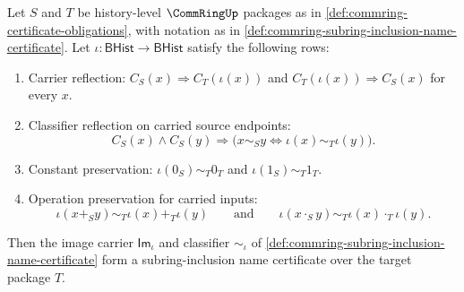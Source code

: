 \begin{theorem}
\label{thm:commring-carrier-reflection-subring-inclusion-certificate}
Let $S$ and $T$ be history-level $\CommRingUp$ packages as in \autoref{def:commring-certificate-obligations}, with notation as in \autoref{def:commring-subring-inclusion-name-certificate}. Let $\iota:\mathsf{BHist}\to\mathsf{BHist}$ satisfy the following rows:
\begin{enumerate}
  \item Carrier reflection: $C_S(x)\Longrightarrow C_T(\iota(x))$ and $C_T(\iota(x))\Longrightarrow C_S(x)$ for every $x$.
  \item Classifier reflection on carried source endpoints:
$$
C_S(x)\land C_S(y)\Longrightarrow \bigl(x\sim_S y\Longleftrightarrow \iota(x)\sim_T\iota(y)\bigr).
$$
  \item Constant preservation: $\iota(0_S)\sim_T0_T$ and $\iota(1_S)\sim_T1_T$.
  \item Operation preservation for carried inputs:
$$
\iota(x+_S y)\sim_T\iota(x)+_T\iota(y)\qquad\text{and}\qquad \iota(x\cdot_S y)\sim_T\iota(x)\cdot_T\iota(y).
$$
\end{enumerate}
Then the image carrier $\mathsf{Im}_{\iota}$ and classifier $\sim_{\iota}$ of \autoref{def:commring-subring-inclusion-name-certificate} form a subring-inclusion name certificate over the target package $T$.
\end{theorem}
